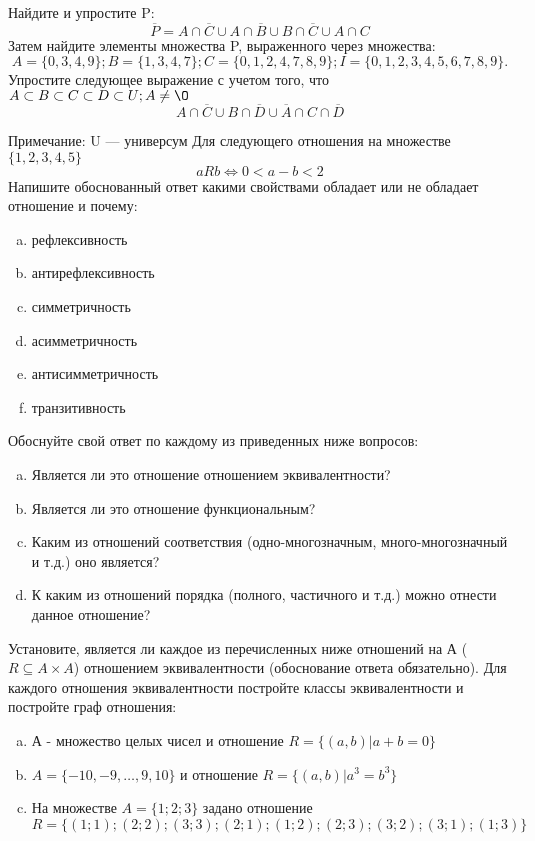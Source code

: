 \documentclass[10pt]{exam}
\begin{document}
\begin{questions}
\question
Найдите и упростите P:
\begin{equation*}
\overline{P} = A \cap \overline{C} \cup A \cap \overline{B} \cup B \cap \overline{C} \cup A \cap C
\end{equation*}
Затем найдите элементы множества P, выраженного через множества:
\begin{equation*}
A = \{0, 3, 4, 9\}; 
B = \{1, 3, 4, 7\};
C = \{0, 1, 2, 4, 7, 8, 9\};
I = \{0, 1, 2, 3, 4, 5, 6, 7, 8, 9\}.
\end{equation*}\question
Упростите следующее выражение с учетом того, что $A\subset B \subset C \subset D \subset U; A \neq \O$
\begin{equation*}
A \cap  \overline{C} \cup B \cap \overline{D} \cup  \overline{A} \cap C \cap  \overline{D}
\end{equation*}

Примечание: U — универсум\question
Для следующего отношения на множестве $\{1, 2, 3, 4, 5\}$ 
\begin{equation*}
aRb \iff 0 < a-b<2
\end{equation*}
Напишите обоснованный ответ какими свойствами обладает или не обладает отношение и почему:   
\begin{enumerate} [a)]\setcounter{enumi}{0}
\item рефлексивность
\item антирефлексивность
\item симметричность
\item асимметричность
\item антисимметричность
\item транзитивность
\end{enumerate}

Обоснуйте свой ответ по каждому из приведенных ниже вопросов:
\begin{enumerate} [a)]\setcounter{enumi}{0}
    \item Является ли это отношение отношением эквивалентности?
    \item Является ли это отношение функциональным?
    \item Каким из отношений соответствия (одно-многозначным, много-многозначный и т.д.) оно является?
    \item К каким из отношений порядка (полного, частичного и т.д.) можно отнести данное отношение?
\end{enumerate}
\question
Установите, является ли каждое из перечисленных ниже отношений на А ($R \subseteq A \times A$) отношением эквивалентности (обоснование ответа обязательно). Для каждого отношения эквивалентности 
постройте классы эквивалентности и постройте граф отношения:
\begin{enumerate}[a)]\setcounter{enumi}{0}
\item А - множество целых чисел и отношение $R = \{(a,b)|a + b = 0\}$
\item $A = \{-10, -9, …, 9, 10\}$ и отношение $R = \{(a,b)|a^{3} = b^{3}\}$
\item На множестве $A = \{1; 2; 3\}$ задано отношение $R = \{(1; 1); (2; 2); (3; 3); (2; 1); (1; 2); (2; 3); (3; 2); (3; 1); (1; 3)\}$


\end{enumerate}
\end{questions}
\end{document}
